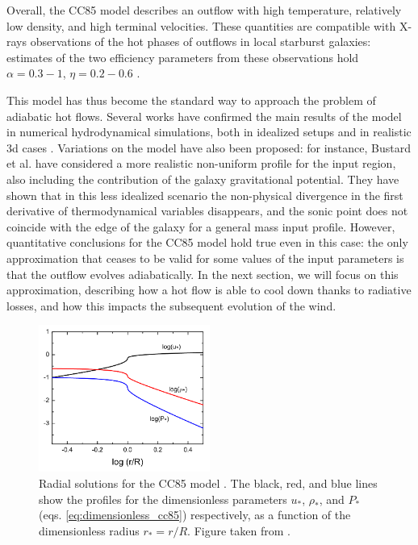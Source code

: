 Overall, the CC85 model describes an outflow with high temperature, relatively low density, and high terminal velocities. These quantities are compatible with X-rays observations of the hot phases of outflows in local starburst galaxies: estimates of the two efficiency parameters from these observations hold $\alpha=0.3-1$, $\eta=0.2-0.6$  \citep[e.g.,][]{strickland2009supernova, zhang2014hot}. 

This model has thus become the standard way to approach the problem of adiabatic hot flows. Several works have confirmed the main results of the model in numerical hydrodynamical simulations, both in idealized setups \citep{Strickland:2000jg} and in realistic 3d cases \citep{cooper2009starburst, schneider2018production}. Variations on the model have also been proposed: for instance, Bustard et al. \citep{bustard2016versatile} have considered a more realistic non-uniform profile for the input region, also including the contribution of the galaxy gravitational potential. They have shown that in this less idealized scenario the non-physical divergence in the first derivative of thermodynamical variables disappears, and the sonic point does not coincide with the edge of the galaxy for a general mass input profile. However, quantitative conclusions for the CC85 model hold true even in this case: the only approximation that ceases to be valid for some values of the input parameters is that the outflow evolves adiabatically. In the next section, we will focus on this approximation, describing how a hot flow is able to cool down thanks to radiative losses, and how this impacts the subsequent evolution of the wind.  




\begin{figure}
    \centering
    \includegraphics[width=0.5\textwidth]{plots/cc85.PNG}
    \caption{Radial solutions for the CC85 model \citep{chevalier_clegg:1985}. The black, red, and blue lines show the profiles for the dimensionless parameters $u_*$, $\rho_*$, and $P_*$ (eqs. \ref{eq:dimensionless_cc85}) respectively, as a function of the dimensionless radius $r_*=r/R$. Figure taken from \citet{zhang2018review}.
    }
    \label{fig:cc85} 
\end{figure}




